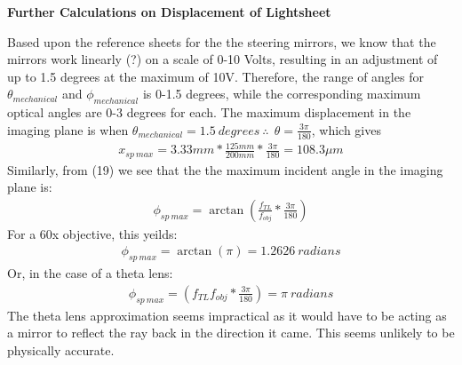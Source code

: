 \newpage
\begin{center}
    \textbf{Further Calculations on Displacement of Lightsheet}
\end{center}
Based upon the reference sheets for the the steering mirrors, we know that the mirrors work linearly (?) on a scale of 0-10 Volts, resulting in an adjustment of up to 1.5 degrees at the maximum of 10V. Therefore, the range of angles for $\theta_{mechanical}$ and $\phi_{mechanical}$ is 0-1.5 degrees, while the corresponding maximum optical angles are 0-3 degrees for each.
The maximum displacement in the imaging plane is when $\theta_{mechanical}=1.5 \ degrees \ \therefore \ \ \theta = \frac{3\pi}{180}$,
which gives
\begin{gather}
    x_{sp \ max} = 3.33mm * \frac{125mm}{200mm}*\frac{3\pi}{180} = 108.3\mu m
\end{gather}
Similarly, from (19) we see that the the maximum incident angle in the imaging plane is:
\begin{gather}
    \phi_{sp \ max} = \arctan(\frac{f_{TL}}{f_{obj}}*\frac{3\pi}{180})
\end{gather}
For a 60x objective, this yeilds:
\begin{gather}
    \phi_{sp \ max} = \arctan(\pi) = 1.2626 \ radians
\end{gather}
Or, in the case of a theta lens:
\begin{gather}
    \phi_{sp \ max} = (f_{TL}f_{obj}*\frac{3\pi}{180}) = \pi \ radians 
\end{gather}
The theta lens approximation seems impractical as it would have to be acting as a mirror to reflect the ray back in the direction it came. This seems unlikely to be physically accurate.\\

